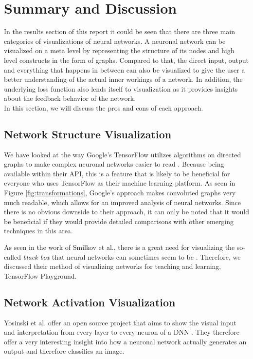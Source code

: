 \documentclass{acmsiggraph}               %
\begin{document}
\section{Summary and Discussion}
In the results section of this report it could be seen that there are three main categories of visualizations of neural networks. A neuronal network can be visualized on a meta level by representing the structure of its nodes and high level constructs in the form of graphs. Compared to that, the direct input, output and everything that happens in between can also be visualized to give the user a better understanding of the actual inner workings of a network. In addition, the underlying loss function also lends itself to visualization as it provides insights about the feedback behavior of the network.\\
In this section, we will discuss the pros and cons of each approach.\\

\subsection{Network Structure Visualization}

We have looked at the way Google's TensorFlow utilizes algorithms on directed graphs to make complex neuronal networks easier to read \cite{Wongsuphasawat2018}. Because being available within their API, this is a feature that is likely to be beneficial for everyone who uses TensorFlow as their machine learning platform. As seen in Figure \ref{fig:transformations}, Google's approach makes convoluted graphs very much readable, which allows for an improved analysis of neural networks. Since there is no obvious downside to their approach, it can only be noted that it would be beneficial if they would provide detailed comparisons with other emerging techniques in this area.

As seen in the work of Smilkov et al., there is a great need for visualizing the so-called \textit{black box} that neural networks can sometimes seem to be \cite{Smilkov2017}. Therefore, we discussed their method of visualizing networks for teaching and learning, TensorFlow Playground.

\subsection{Network Activation Visualization}

Yosinski et al. offer an open source project that aims to show the visual input and interpretation from every layer to every neuron of a DNN \cite{Yosinski2015}. They therefore offer a very interesting insight into how a neuronal network actually generates an output and therefore classifies an image.
\end{document}
